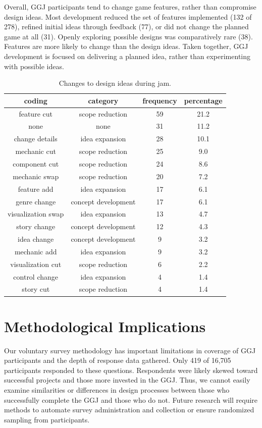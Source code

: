 \documentclass{sig-alternate}
\begin{document}
Overall, GGJ participants tend to change game features, rather than compromise design ideas. Most development reduced the set of features implemented (132 of 278), refined initial ideas through feedback (77), or did not change the planned game at all (31). 
Openly exploring possible designs was comparatively rare (38). 
Features are more likely to change than the design ideas. Taken together, GGJ development is focused on delivering a planned idea, rather than experimenting with possible ideas.

\begin{table}[tb]
\centering
\scriptsize
\begin{tabular}{|c|c|c|c|}
\hline coding & category & frequency & percentage \\ 
\hline feature cut & scope reduction & 59 & 21.2 \\ 
\hline none & none & 31 & 11.2 \\ 
\hline change details & idea expansion & 28 & 10.1 \\ 
\hline mechanic cut & scope reduction & 25 & 9.0 \\ 
\hline component cut & scope reduction & 24 & 8.6 \\ 
\hline mechanic swap & scope reduction & 20 & 7.2 \\ 
\hline feature add & idea expansion & 17 & 6.1 \\ 
\hline genre change & concept development & 17 & 6.1 \\ 
\hline visualization swap & idea expansion & 13 & 4.7 \\ 
\hline story change & concept development & 12 & 4.3 \\ 
\hline idea change & concept development & 9 & 3.2 \\ 
\hline mechanic add & idea expansion & 9 & 3.2 \\ 
\hline visualization cut & scope reduction & 6 & 2.2 \\ 
\hline control change & idea expansion & 4 & 1.4 \\ 
\hline story cut & scope reduction & 4 & 1.4 \\ 
\hline 
\end{tabular} 
\caption{Changes to design ideas during jam.}
\label{tab:idea_changes}
\end{table}

\section{Methodological Implications}
Our voluntary survey methodology has important limitations in coverage of GGJ participants and the depth of response data gathered. Only 419 of 16,705 participants responded to these questions. Respondents were likely skewed toward successful projects and those more invested in the GGJ. Thus, we cannot easily examine similarities or differences in design processes between those who successfully complete the GGJ and those who do not. Future research will require methods to automate survey administration and collection or ensure randomized sampling from participants.
\end{document}
